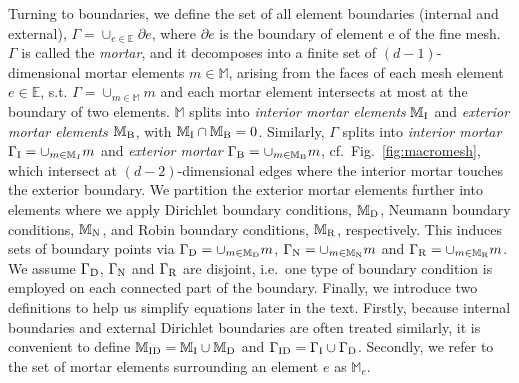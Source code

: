 Turning to boundaries, we define the set of all element boundaries (internal and external), $\Gamma = \cup_{e \in \mathbb{E}} \partial e $, where $\partial e$
is the boundary of element e of the fine mesh.  $\Gamma$ is called the \emph{mortar}, and it decomposes into a finite set of $(d-1)$-dimensional mortar
elements $m\in \mathbb{M}$, arising from the faces of each mesh element $e\in \mathbb{E}$, s.t. $\Gamma=\cup_{m\in\mathbb{M}}m$ and each mortar element intersects at most at the boundary of two elements.  
$\mathbb{M}$ splits into \textit{interior mortar elements}
$\mathbb{M}_{\rm I}$ and \textit{exterior mortar elements}
$\mathbb{M}_{\rm B}$, with $\mathbb{M}_{\rm I}\cap\mathbb{M}_{\rm B}=0$. 
Similarly, $\Gamma$ splits into
\textit{interior mortar} $\Gamma_{\rm I}=\cup_{m\in\mathbb{M}_I}m$ and \textit{exterior mortar} $\Gamma_{\rm B}=\cup_{m\in\mathbb{M}_{\rm B}}m$,
  cf.~Fig.~\ref{fig:macromesh}, which intersect
  at $(d-2)$-dimensional edges where the interior mortar touches the exterior boundary.
    We partition the exterior mortar elements further into elements where we
  apply Dirichlet boundary conditions, $\mathbb{M}_{\rm D}$, Neumann
  boundary conditions, $\mathbb{M}_{\rm N}$, and Robin boundary conditions, $\mathbb{M}_{\rm R}$, respectively.  This induces sets of
  boundary points via $\Gamma_{\rm D}=\cup _{m \in \mathbb{M}_{\rm D}} m$, $\Gamma_{\rm N}=\cup _{m \in \mathbb{M}_{\rm N}} m$ and $\Gamma_{\rm R}=\cup _{m \in \mathbb{M}_{\rm R}} m$.
  We assume $\Gamma_{\rm D}$, $\Gamma_{\rm N}$ and $\Gamma_{\rm R}$ are disjoint, i.e.\ one type of boundary condition is employed on each connected part of the boundary.
  Finally, we introduce two definitions to help us simplify equations later in the text. Firstly,
  because internal boundaries and external Dirichlet boundaries are
  often treated similarly, it is convenient to define $\mathbb{M}_{\rm
    ID}=\mathbb{M}_{\rm I}\cup \mathbb{M}_{\rm D}$ and $\Gamma_{\rm ID}=\Gamma_{\rm I}\cup\Gamma_{\rm D}$. 
Secondly, we refer to the set of mortar elements surrounding an element $e$ as $\mathbb{M}_e$.
